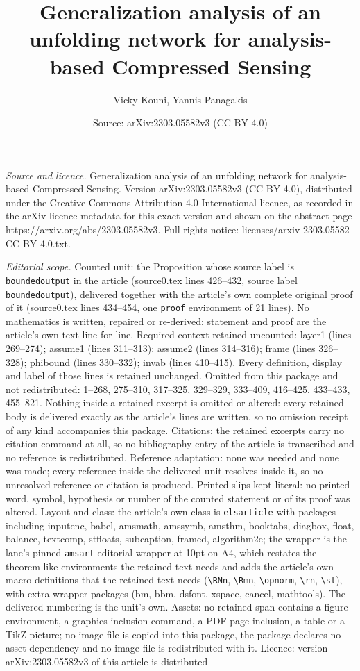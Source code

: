 \documentclass[10pt,a4paper]{amsart}
\title[Generalization analysis of an unfolding network for analysis]{Generalization analysis of an unfolding network for analysis-based Compressed Sensing}
\author{Vicky Kouni, Yannis Panagakis}
\date{Source: arXiv:2303.05582v3 (CC BY 4.0)}
\begin{document}
\maketitle

\noindent\emph{Source and licence.} Generalization analysis of an unfolding network for analysis-based Compressed Sensing. Version arXiv:2303.05582v3 (CC BY 4.0), distributed under the Creative Commons Attribution 4.0 International licence, as recorded in the arXiv licence metadata for this exact version and shown on the abstract page https://arxiv.org/abs/2303.05582v3. Full rights notice: licenses/arxiv-2303.05582-CC-BY-4.0.txt.\par\smallskip

\noindent\textit{Editorial scope.} Counted unit: the Proposition whose source label is \texttt{boundedoutput} in the article (source0.tex lines 426--432, source label \texttt{boundedoutput}), delivered together with the article's own complete original proof of it (source0.tex lines 434--454, one \texttt{proof} environment of 21 lines). No mathematics is written, repaired or re-derived: statement and proof are the article's own text line for line. Required context retained uncounted: layer1 (lines 269--274); assume1 (lines 311--313); assume2 (lines 314--316); frame (lines 326--328); phibound (lines 330--332); invab (lines 410--415). Every definition, display and label of those lines is retained unchanged. Omitted from this package and not redistributed: 1--268, 275--310, 317--325, 329--329, 333--409, 416--425, 433--433, 455--821. Nothing inside a retained excerpt is omitted or altered: every retained body is delivered exactly as the article's lines are written, so no omission receipt of any kind accompanies this package. Citations: the retained excerpts carry no citation command at all, so no bibliography entry of the article is transcribed and no reference is redistributed. Reference adaptation: none was needed and none was made; every reference inside the delivered unit resolves inside it, so no unresolved reference or citation is produced. Printed slips kept literal: no printed word, symbol, hypothesis or number of the counted statement or of its proof was altered. Layout and class: the article's own class is \texttt{elsarticle} with packages including inputenc, babel, amsmath, amssymb, amsthm, booktabs, diagbox, float, balance, textcomp, stfloats, subcaption, framed, algorithm2e; the wrapper is the lane's pinned \texttt{amsart} editorial wrapper at 10pt on A4, which restates the theorem-like environments the retained text needs and adds the article's own macro definitions that the retained text needs (\texttt{\textbackslash RNn}, \texttt{\textbackslash Rmn}, \texttt{\textbackslash opnorm}, \texttt{\textbackslash rn}, \texttt{\textbackslash st}), with extra wrapper packages (bm, bbm, dsfont, xspace, cancel, mathtools). The delivered numbering is the unit's own. Assets: no retained span contains a figure environment, a graphics-inclusion command, a PDF-page inclusion, a table or a TikZ picture; no image file is copied into this package, the package declares no asset dependency and no image file is redistributed with it. Licence: version arXiv:2303.05582v3 of this article is distributed 
\end{document}
